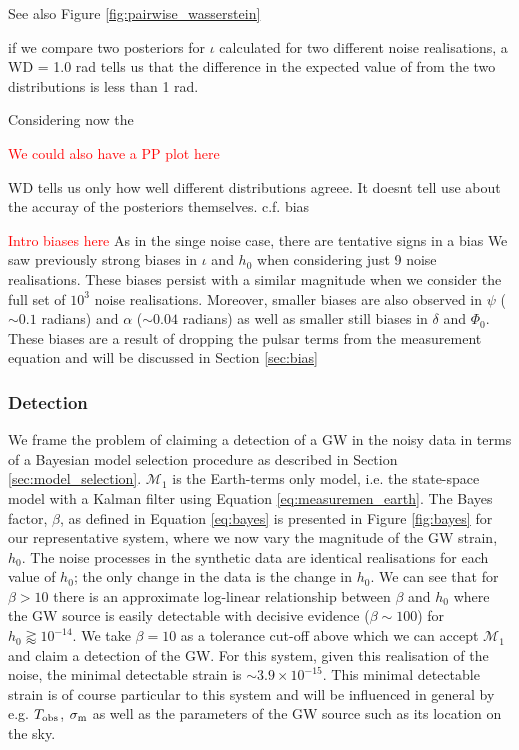 \documentclass[fleqn,usenatbib,useAMS]{mnras}
\begin{document}
See also Figure \ref{fig:pairwise_wasserstein}



if we compare two posteriors for $\iota$ calculated for two different noise realisations, a WD = 1.0 rad tells us that the difference in the expected value of from the two distributions is less than 1 rad. \newline 

Considering now the 














\textcolor{red}{We could also have a PP plot here}

WD tells us only how well different distributions agreee. It doesnt tell use about the accuray of the posteriors themselves. c.f. bias

\textcolor{red}{Intro biases here}
As in the singe noise case, there are tentative signs in a bias 
We saw previously strong biases in $\iota$ and $h_0$ when considering just 9 noise realisations. These biases persist with a similar magnitude when we consider the full set of $10^3$ noise realisations. Moreover, smaller biases are also observed in $\psi$ ($\sim 0.1$ radians) and $\alpha$ ($\sim 0.04$ radians) as well as smaller still biases in $\delta$ and $\Phi_0$. These biases are a result of dropping the pulsar terms from the measurement equation and will be discussed in Section \ref{sec:bias}





\subsubsection{Detection} \label{sec:detection}
We frame the problem of claiming a detection of a GW in the noisy data in terms of a Bayesian model selection procedure as described in Section \ref{sec:model_selection}. $\mathcal{M}_1$ is the Earth-terms only model, i.e. the state-space model with a Kalman filter using Equation \eqref{eq:measuremen_earth}. The Bayes factor, $\beta$, as defined in Equation \eqref{eq:bayes} is presented in Figure \ref{fig:bayes} for our representative system, where we now vary the magnitude of the GW strain, $h_0$. The noise processes in the synthetic data are identical realisations for each value of $h_0$; the only change in the data is the change in $h_0$. We can see that for $\beta >10$ there is an approximate log-linear relationship between $\beta$ and $h_0$ where the GW source is easily detectable with decisive evidence ($\beta \sim 100$) for $h_0 \gtrapprox 10^{-14}$. We take $\beta = 10$ as a tolerance cut-off above which we can accept $\mathcal{M}_1$ and claim a detection of the GW. For this system, given this realisation of the noise, the minimal detectable strain is $\sim 3.9 \times 10^{-15}$. This minimal detectable strain is of course particular to this system and will be influenced in general by e.g. $T_{\rm obs}$, $\sigma_{\rm m}$ as well as the parameters of the GW source such as its location on the sky. \newline 
\end{document}
